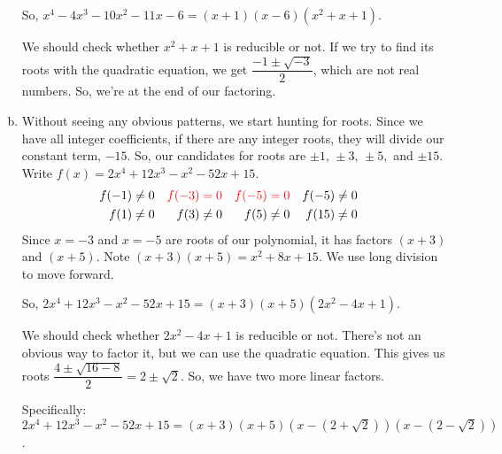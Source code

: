 \begin{solution}
\begin{enumerate}[(a)]
 So, $x^4-4x^3-10x^2-11x-6 = (x+1)(x-6)(x^2+x+1)$.

 We should check whether $x^2+x+1$ is reducible or not. If we try to find its roots with the quadratic equation, we get $\dfrac{-1\pm\sqrt{-3}}{2}$, which are not real numbers. So, we're at the end of our factoring.

 \item Without seeing any obvious patterns, we start hunting for roots. Since we have all integer coefficients, if there are any integer roots, they will divide our constant term, $-15$. So, our candidates for roots are $\pm1,\,\pm3,\,\pm5,$ and $\pm15$.
Write $f(x) = 2x^4  + 12x^3 - x^2 - 52x + 15$.
\begin{align*}
f(-1)&\neq 0&
\color{red}f(-3)&\color{red}=0&
\color{red}f(-5)&\color{red}= 0&
f(-5)&\neq 0\\
f(1)&\neq 0&
f(3)&\neq 0&
f(5)&\neq 0&
f(15)&\neq 0&
\end{align*}
Since $x=-3$ and $x=-5$ are roots of our polynomial, it has factors $(x+3)$ and $(x+5)$. Note $(x+3)(x+5) = x^2+8x+15$. We use long division to move forward.

\begin{center}
 \end{center}

 So, $2x^4+12x^3-x^2-52x+15= (x+3)(x+5)(2x^2-4x+1)$.

 We should check whether $2x^2-4x+1$ is reducible or not. There's not an obvious way to factor it, but we can  use the quadratic equation. This gives us roots
 $\dfrac{4\pm\sqrt{16-8}}{2}=2\pm\sqrt2$. So, we have two more linear factors.

Specifically:  $2x^4+12x^3-x^2-52x+15= (x+3)(x+5)\left(x-(2+\sqrt2)\right)\left(x-(2-\sqrt2)\right)$.

\end{enumerate}

\end{solution}


